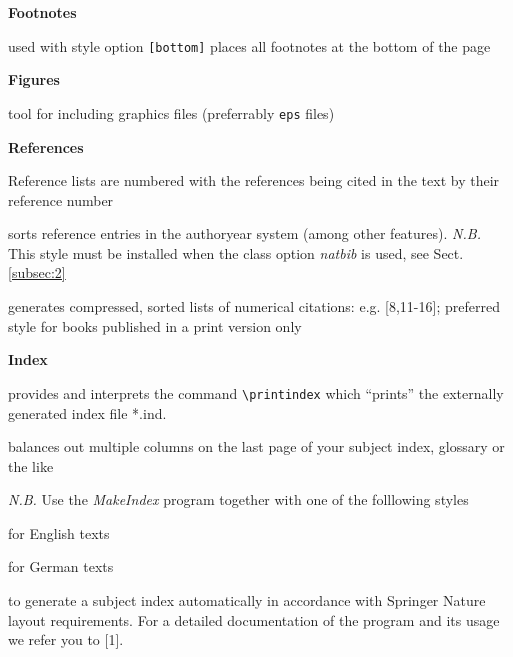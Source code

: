 \documentclass[graybox]{svmult}
\begin{document}
\begin{refguide}
\begin{sloppy}
\textbf{Footnotes}

\begin{description}
\item[\texttt{footmisc.sty}] used with style option \texttt{[bottom]} places all footnotes at
the bottom of the page
\end{description}

\pagebreak


\textbf{Figures}

\begin{description}
\item[\texttt{graphicx.sty}] tool for including graphics files (preferrably \texttt{eps} files)
\end{description}


\textbf{References}

\begin{description}
\item[\textit{default}] Reference lists are numbered with the references being
cited in the text by their reference number
\item[\texttt{natbib.sty}] sorts reference entries in the author­year system (among
other features). \textit{N.B.} This style must be installed when
the class option \textit{natbib} is used, see Sect. \ref{subsec:2}
\item[\texttt{cite.sty}] generates compressed, sorted lists of numerical citations:
e.g. [8,{\break}11-­16]; preferred style for books published in a print version only
\end{description}


\textbf{Index}

\begin{description}
\item[\texttt{makeidx.sty}] provides and interprets the command \verb|\printindex|
which ``prints'' the externally generated index file *.ind.
\item[\texttt{multicol.sty}] balances out multiple columns on the last page of your
subject index, glossary or the like
\end{description}


\textit{N.B.} Use the \textit{MakeIndex} program together with one of the folllowing styles

\begin{description}
\item[\texttt{svind.ist}] for English texts
\item[\texttt{svindd.ist}] for German texts
\end{description}
to generate a subject index automatically in accordance with Springer Nature layout
requirements. For a detailed documentation of the program and its usage we
refer you to [1].


\end{sloppy}
\end{refguide}
\end{document}
